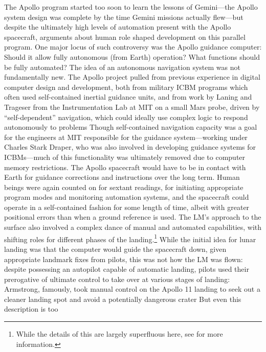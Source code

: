 The Apollo program started too soon to learn the lessons of
Gemini---the Apollo system design was complete by the time Gemini
missions actually flew---but despite the
ultimately high levels of automation present with the Apollo
spacecraft, arguments about human role shaped development on this
parallel program. One major locus of such controversy was the Apollo
guidance computer: Should it allow fully autonomous (from Earth)
operation? What functions should be fully automated? The idea of an
autonomous navigation system was not fundamentally new. The Apollo
project pulled from previous experience in digital computer design and
development, both from military ICBM programs which often used
self-contained inertial guidance units, and from work by Laning and
Trageser from the Instrumentation Lab at MIT on a small Mars probe,
driven by ``self-dependent'' navigation, which could ideally use
complex logic to respond autonomously to problems\cite[p. 99-100]{DM}
Though self-contained navigation capacity was a goal
for the engineers at MIT responsible for the guidance system---working
under Charles Stark Draper, who was also involved in developing
guidance systems for ICBMs---much of this functionality was ultimately
removed due to computer memory restrictions\cite{tindallMay12}. The Apollo
spacecraft would have to be in contact with Earth for guidance
corrections and instructions over the long term. Human beings were
again counted on for sextant readings, for initiating appropriate
program modes and monitoring automation systems\cite[p.
  4]{BennettExperience}, and the spacecraft 
could operate in a self-contained fashion for some length of
time, albeit with greater positional errors than when a ground
reference is used\cite[p. 191]{BennettCheatham}. The LM's approach
to the surface also involved a complex dance of manual and automated
capabilities, with shifting roles for different phases of the
landing.\footnote{While the details of this are largely superfluous
  here, see \cite{BennettCheatham} for more information.} While the initial
idea for lunar landing was that the 
computer would guide the spacecraft down, given appropriate landmark
fixes from pilots, this was not how the LM was flown: despite
possessing an autopilot capable of automatic landing, pilots used
their prerogative of ultimate control to take over at various stages
of landing: Armstrong, famously, took manual control on the Apollo 11
landing to seek out a cleaner landing spot and avoid a potentially
dangerous crater\cite[p. 3]{DM} But even this description is too

